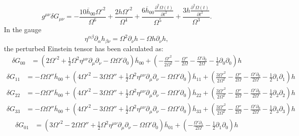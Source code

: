 \documentclass[10pt,letterpaper]{article}
\newcommand{\be}{\begin{equation}} %
\newcommand{\ee}{\end{equation}} %
\newcommand{\pd}{\partial}
\numberwithin{equation}{section}
\begin{document}
\be
	g^{\mu\nu}\delta G_{\mu\nu} = - \frac{10 \overline{h}_{00} \Omega'^2}{\Omega^6} + \frac{2 h \Omega'^2}{\Omega^4} + \frac{6 \overline{h}_{00} \frac{\partial^{2}\Omega(t)}{\partial t^{2}}}{\Omega^5} + \frac{3 h \frac{\partial^{2}\Omega(t)}{\partial t^{2}}}{\Omega^3}.
\ee 
In the gauge
\be
	\eta^{\alpha\beta}\pd_{\alpha}h_{\beta\nu} = \Omega^2 \pd_\nu h - \Omega h \pd_\nu h,
\ee
the perturbed Einstein tensor has been calculated as:
\begin{align}
	\delta  G_{00} &= (2 \Omega '^2 + \tfrac{1}{2} \Omega^2 \eta^{\mu \nu} \partial_{\mu} \partial_{\nu} -  \Omega \Omega ' \partial_{0}) \overline{h}_{00} + (- \frac{\Omega '^2}{2 \Omega^2} -  \frac{\Omega ''}{2 \Omega} -  \frac{\Omega ' \partial_{0}}{2 \Omega} -  \tfrac{1}{2} \partial_{0} \partial_{0}) h
\end{align}
\begin{align}
	\delta  G_{11} &= - \Omega \Omega '' \overline{h}_{00} + (4 \Omega '^2 - 3 \Omega \Omega '' + \tfrac{1}{2} \Omega^2 \eta^{\mu \nu} \partial_{\mu} \partial_{\nu} -  \Omega \Omega ' \partial_{0}) \overline{h}_{11} + (\frac{3 \Omega '^2}{2 \Omega^2} -  \frac{\Omega ''}{2 \Omega} -  \frac{\Omega ' \partial_{0}}{2 \Omega} -  \tfrac{1}{2} \partial_{1} \partial_{1}) h
\end{align}
\begin{align}
	\delta G_{22} &=- \Omega \Omega '' \overline{h}_{00} + (4 \Omega '^2 - 3 \Omega \Omega '' + \tfrac{1}{2} \Omega^2 \eta^{\mu \nu} \partial_{\mu} \partial_{\nu} -  \Omega \Omega ' \partial_{0}) \overline{h}_{22} + (\frac{3 \Omega '^2}{2 \Omega^2} -  \frac{\Omega ''}{2 \Omega} -  \frac{\Omega ' \partial_{0}}{2 \Omega} -  \tfrac{1}{2} \partial_{2} \partial_{2}) h
\end{align}
\begin{align}
	\delta G_{33} &=- \Omega \Omega '' \overline{h}_{00} + (4 \Omega '^2 - 3 \Omega \Omega '' + \tfrac{1}{2} \Omega^2 \eta^{\mu \nu} \partial_{\mu} \partial_{\nu} -  \Omega \Omega ' \partial_{0}) \overline{h}_{33} + (\frac{3 \Omega '^2}{2 \Omega^2} -  \frac{\Omega ''}{2 \Omega} -  \frac{\Omega ' \partial_{0}}{2 \Omega} -  \tfrac{1}{2} \partial_{3} \partial_{3}) h
\end{align}
\begin{align}
	\delta G_{01} &=(3 \Omega '^2 - 2 \Omega \Omega '' + \tfrac{1}{2} \Omega^2 \eta^{\mu \nu} \partial_{\mu} \partial_{\nu} -  \Omega \Omega ' \partial_{0}) \overline{h}_{01} + (- \frac{\Omega ' \partial_{1}}{2 \Omega} -  \tfrac{1}{2} \partial_{1} \partial_{0}) h
\end{align}
\end{document}
